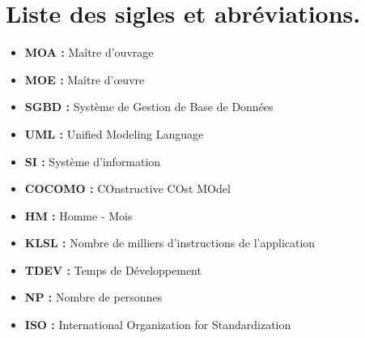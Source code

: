 \chapter*{Liste des sigles et abréviations.}
\thispagestyle{fancy}
\vspace{-2cm}


\begin{itemize}[label=\textbullet, font=\LARGE \color{blue}]    
 \item \textbf {MOA  :} Maître d’ouvrage
 \item \textbf {MOE  :} Maître d’œuvre
 \item \textbf {SGBD :} Système de Gestion de Base de Données
 \item \textbf {UML :} Unified Modeling Language
 \item \textbf {SI :} Système d'information
 \item \textbf {COCOMO :} COnstructive COst MOdel 
 \item \textbf{HM :} Homme - Mois 
 \item \textbf{KLSL :} Nombre de milliers d'instructions de l'application 
 \item \textbf{TDEV :} Temps de Développement  
 \item \textbf{NP :} Nombre de personnes 
 \item \textbf{ISO :} International Organization for Standardization
\end{itemize}